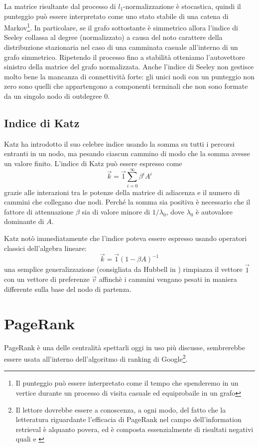 La matrice risultante dal processo di $l_1$-normalizzazione è stocastica, quindi il punteggio può essere interpretato come uno stato stabile di una catena di Markov\footnote{Il punteggio può essere interpretato come il tempo che spenderemo in un vertice durante un processo di visita casuale ed equiprobaile in un grafo}. In particolare, se il grafo sottostante è simmetrico allora l'indice di Seeley collassa al degree (normalizzato) a causa del noto carattere della distribuzione stazionaria nel caso di una camminata casuale all'interno di un grafo simmetrico. Ripetendo il processo fino a stabilità otteniamo l'autovettore sinistro della matrice del grafo normalizzata.
Anche l'indice di Seeley non gestisce molto bene la mancanza di connettività forte: gli unici nodi con un punteggio non zero sono quelli che appartengono a componenti terminali che non sono formate da un singolo nodo di outdegree 0.
\subsection{Indice di Katz}
Katz ha introdotto il suo celebre indice \cite{katz} usando la somma su tutti i percorsi entranti in un nodo, ma pesando ciascun cammino di modo che la somma avesse un valore finito. L'indice di Katz può essere espresso come
\begin{equation}
	\vec{k} = \vec{1} \sum_{i = 0}^{\infty}{\beta^i A^i}
\end{equation}
grazie alle interazioni tra le potenze della matrice di adiacenza e il numero di cammini che collegano due nodi. Perché la somma sia positiva è necessario che il fattore di attenuazione $\beta$ sia di valore minore di $1 / \lambda_0$, dove $\lambda_0$ è autovalore dominante di $A$.

Katz notò immediatamente che l'indice poteva essere espresso usando operatori classici dell'algebra lineare:
\begin{equation}
	\vec{k} = \vec{1}(1 - \beta A)^{-1}
\end{equation}
una semplice generalizzazione (consigliata da Hubbell in \cite{hub}) rimpiazza il vettore $\vec{1}$ con un vettore di preferenze $\vec{v}$ affinchè i cammini vengano pesati in maniera differente sulla base del nodo di partenza.
\section{PageRank}
PageRank è una delle centralità spettarli oggi in uso più discusse, sembrerebbe essere usata all'interno dell'algoritmo di ranking di Google\footnote{Il lettore dovrebbe essere a conoscenza, a ogni modo, del fatto che la letteratura riguardante l'efficacia di PageRank nel campo dell'information retrieval è alquanto povera, ed è composta essenzialmente di risultati negativi quali \cite{prank} e \cite{prankoind}}.


